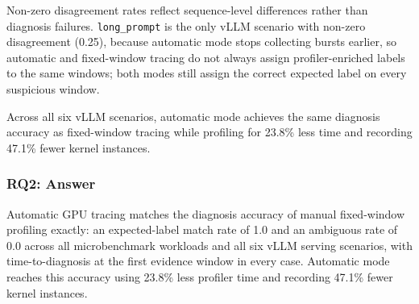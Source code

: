 Non-zero disagreement rates reflect sequence-level differences rather than diagnosis failures. \texttt{long\_prompt} is the only vLLM scenario with non-zero disagreement (0.25), because automatic mode stops collecting bursts earlier, so automatic and fixed-window tracing do not always assign profiler-enriched labels to the same windows; both modes still assign the correct expected label on every suspicious window.



Across all six vLLM scenarios, automatic mode achieves the same diagnosis accuracy as fixed-window tracing while profiling for 23.8\% less time and recording 47.1\% fewer kernel instances.


\subsubsection{RQ2: Answer}

Automatic GPU tracing matches the diagnosis accuracy of manual fixed-window profiling exactly: an expected-label match rate of 1.0 and an ambiguous rate of 0.0 across all microbenchmark workloads and all six vLLM serving scenarios, with time-to-diagnosis at the first evidence window in every case. Automatic mode reaches this accuracy using 23.8\% less profiler time and recording 47.1\% fewer kernel instances.
